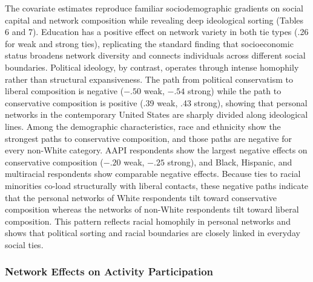 \documentclass[
  12pt
]{article}
\begin{document}
The covariate estimates reproduce familiar sociodemographic gradients on social capital and network composition while revealing deep ideological sorting (Tables 6 and 7). Education has a positive effect on network variety in both tie types (.26 for weak and strong ties), replicating the standard finding that socioeconomic status broadens network diversity and connects individuals across different social boundaries. Political ideology, by contrast, operates through intense homophily rather than structural expansiveness. The path from political conservatism to liberal composition is negative ($-.50$ weak, $-.54$ strong) while the path to conservative composition is positive (.39 weak, .43 strong), showing that personal networks in the contemporary United States are sharply divided along ideological lines. Among the demographic characteristics, race and ethnicity show the strongest paths to conservative composition, and those paths are negative for every non-White category. AAPI respondents show the largest negative effects on conservative composition ($-.20$ weak, $-.25$ strong), and Black, Hispanic, and multiracial respondents show comparable negative effects. Because ties to racial minorities co-load structurally with liberal contacts, these negative paths indicate that the personal networks of White respondents tilt toward conservative composition whereas the networks of non-White respondents tilt toward liberal composition. This pattern reflects racial homophily in personal networks and shows that political sorting and racial boundaries are closely linked in everyday social ties.

\subsubsection{Network Effects on Activity Participation}\label{network-effects-on-activity-participation}
\end{document}
